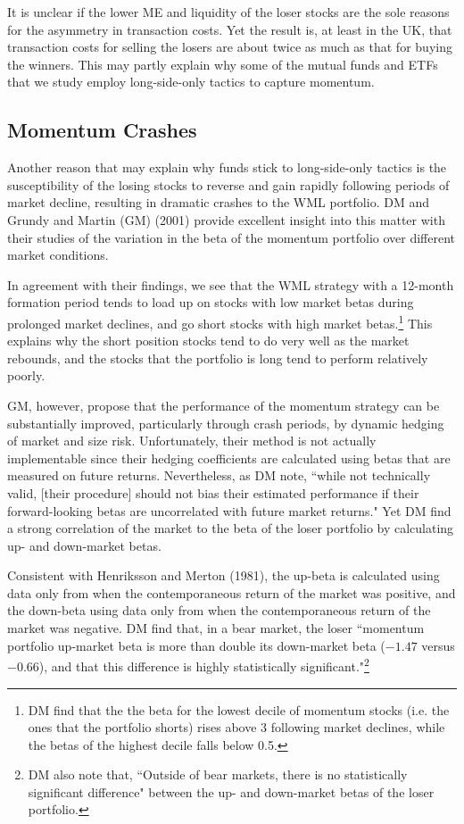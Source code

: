 \documentclass[12pt]{article}
\begin{document}
It is unclear if the lower ME and liquidity of the loser stocks are the sole reasons for the asymmetry in transaction costs. Yet the result is, at least in the UK, that transaction costs for selling the losers are about twice as much as that for buying the winners. This may partly explain why some of the mutual funds and ETFs that we study employ long-side-only tactics to capture momentum. 

\subsection{Momentum Crashes}

Another reason that may explain why funds stick to long-side-only tactics is the susceptibility of the losing stocks to reverse and gain rapidly following periods of market decline, resulting in dramatic crashes to the WML portfolio. DM and Grundy and Martin (GM) (2001) provide excellent insight into this matter with their studies of the variation in the beta of the momentum portfolio over different market conditions.

In agreement with their findings, we see that the WML strategy with a 12-month formation period tends to load up on stocks with low market betas during prolonged market declines, and go short stocks with high market betas.\footnote{DM find that the the beta for the lowest decile of momentum stocks (i.e. the ones that the portfolio shorts) rises above 3 following market declines, while the betas of the highest decile falls below 0.5.} This explains why the short position stocks tend to do very well as the market rebounds, and the stocks that the portfolio is long tend to perform relatively poorly.

GM, however, propose that the performance of the momentum strategy can be substantially improved, particularly through crash periods, by dynamic hedging of market and size risk. Unfortunately, their method is not actually implementable since their hedging coefficients are calculated using betas that are measured on future returns. Nevertheless, as DM note, ``while not technically valid, [their procedure] should not bias their estimated performance if their forward-looking betas are uncorrelated with future market returns." Yet DM find a strong correlation of the market to the beta of the loser portfolio by calculating up- and down-market betas. 

Consistent with Henriksson and Merton (1981), the up-beta is calculated using data only from when the contemporaneous return of the market was positive, and the down-beta using data only from when the contemporaneous return of the market was negative. DM find that, in a bear market, the loser ``momentum portfolio up-market beta is more than double its down-market beta ($-1.47$ versus $-0.66$), and that this difference is highly statistically significant."\footnote{DM also note that, ``Outside of bear markets, there is no statistically significant difference" between the up- and down-market betas of the loser portfolio.}
\end{document}
